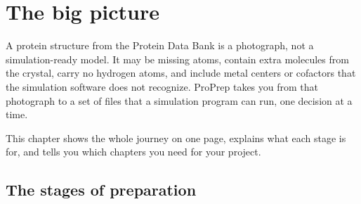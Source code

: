 \chapter{The big picture}
\label{ch:bigpicture}

A protein structure from the Protein Data Bank is a photograph, not a
simulation-ready model. It may be missing atoms, contain extra molecules from
the crystal, carry no hydrogen atoms, and include metal centers or cofactors
that the simulation software does not recognize. ProPrep takes you from that
photograph to a set of files that a simulation program can run, one decision at
a time.

This chapter shows the whole journey on one page, explains what each stage is
for, and tells you which chapters you need for your project.

\section{The stages of preparation}
\label{sec:bigpicture-stages}

